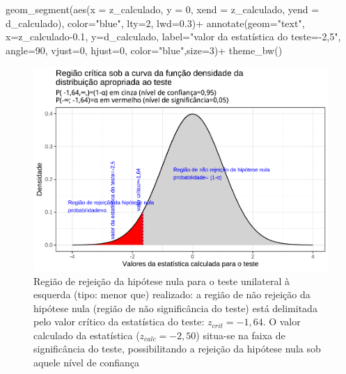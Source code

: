\documentclass[
]{book}
\newenvironment{Shaded}{\begin{snugshade}}{\end{snugshade}}
\newcommand{\AttributeTok}[1]{\textcolor[rgb]{0.77,0.63,0.00}{#1}}
\newcommand{\DecValTok}[1]{\textcolor[rgb]{0.00,0.00,0.81}{#1}}
\newcommand{\FloatTok}[1]{\textcolor[rgb]{0.00,0.00,0.81}{#1}}
\newcommand{\FunctionTok}[1]{\textcolor[rgb]{0.00,0.00,0.00}{#1}}
\newcommand{\NormalTok}[1]{#1}
\newcommand{\SpecialCharTok}[1]{\textcolor[rgb]{0.00,0.00,0.00}{#1}}
\newcommand{\StringTok}[1]{\textcolor[rgb]{0.31,0.60,0.02}{#1}}
\begin{document}
\begin{Shaded}
\begin{Highlighting}[]
  \FunctionTok{geom\_segment}\NormalTok{(}\FunctionTok{aes}\NormalTok{(}\AttributeTok{x =}\NormalTok{ z\_calculado, }\AttributeTok{y =} \DecValTok{0}\NormalTok{, }\AttributeTok{xend =}\NormalTok{ z\_calculado, }\AttributeTok{yend =}\NormalTok{ d\_calculado), }\AttributeTok{color=}\StringTok{"blue"}\NormalTok{, }\AttributeTok{lty=}\DecValTok{2}\NormalTok{, }\AttributeTok{lwd=}\FloatTok{0.3}\NormalTok{)}\SpecialCharTok{+}
  \FunctionTok{annotate}\NormalTok{(}\AttributeTok{geom=}\StringTok{"text"}\NormalTok{, }\AttributeTok{x=}\NormalTok{z\_calculado}\FloatTok{{-}0.1}\NormalTok{, }\AttributeTok{y=}\NormalTok{d\_calculado, }\AttributeTok{label=}\StringTok{"valor da estatística do teste={-}2,5"}\NormalTok{, }\AttributeTok{angle=}\DecValTok{90}\NormalTok{, }\AttributeTok{vjust=}\DecValTok{0}\NormalTok{, }\AttributeTok{hjust=}\DecValTok{0}\NormalTok{, }\AttributeTok{color=}\StringTok{"blue"}\NormalTok{,}\AttributeTok{size=}\DecValTok{3}\NormalTok{)}\SpecialCharTok{+}
  \FunctionTok{theme\_bw}\NormalTok{()}
\end{Highlighting}
\end{Shaded}

\begin{figure}

{\centering \includegraphics[width=1\linewidth]{apostila_files/figure-latex/fig74-1} 

}

\caption{Região de rejeição da hipótese nula para o teste unilateral à esquerda (tipo: menor que) realizado: a região de não rejeição da hipótese nula (região de não significância do teste) está delimitada pelo valor crítico da estatística do teste: $z_{crit} = -1,64$. O valor calculado da estatística ($z_{calc}=-2,50$) situa-se na faixa de significância do teste, possibilitando a rejeição da hipótese nula sob aquele nível de confiança}\label{fig:fig74}
\end{figure}
\end{document}
